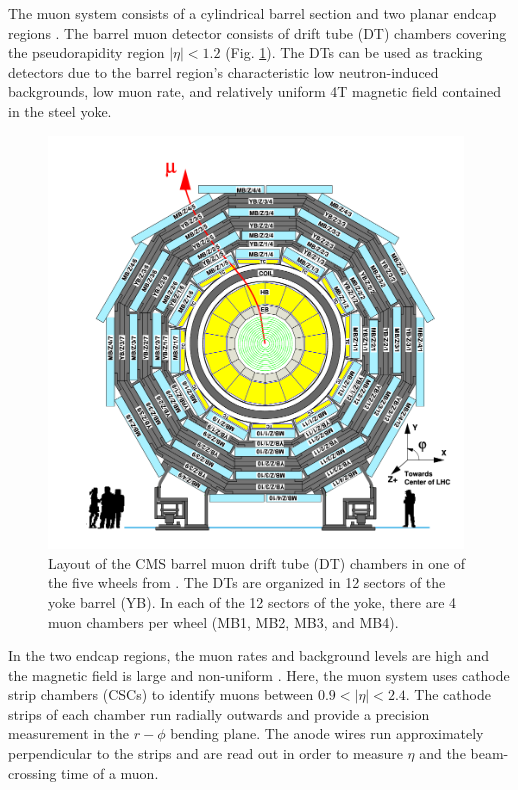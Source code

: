 The muon system consists of a cylindrical barrel section and two planar endcap regions \cite{CMS-2008-JINST-3-S08004}. The barrel muon detector consists of drift tube (DT) chambers covering the pseudorapidity region $|\eta| < 1.2$ (Fig. \ref{fig:phase-1-muon-barrel-DT-schematic}). The DTs can be used as tracking detectors due to the barrel region's characteristic low neutron-induced backgrounds, low muon rate, and relatively uniform 4T magnetic field contained in the steel yoke. 

\begin{figure}[ht]
    \centering
    \includegraphics[width=11cm]{figures/ch-2-cern-cms/phase-1-muon-barrel-DT-schematic.png}
    \caption[Layout of the CMS barrel muon drift tube (DT) chambers in one of the five wheels.]{Layout of the CMS barrel muon drift tube (DT) chambers in one of the five wheels from \cite{CMS-2008-JINST-3-S08004}. The DTs are organized in 12 sectors of the yoke barrel (YB). In each of the 12 sectors of the yoke, there are 4 muon chambers per wheel (MB1, MB2, MB3, and MB4).}
    \label{fig:phase-1-muon-barrel-DT-schematic}
\end{figure}

In the two endcap regions, the muon rates and background levels are high and the magnetic field is large and non-uniform \cite{CMS-2008-JINST-3-S08004}. Here, the muon system uses cathode strip chambers (CSCs) to identify muons between $0.9 < |\eta| < 2.4$. The cathode strips of each chamber run radially outwards and provide a precision measurement in the $r-\phi$ bending plane. The anode wires run approximately perpendicular to the strips and are read out in order to measure $\eta$ and the beam-crossing time of a muon. 


